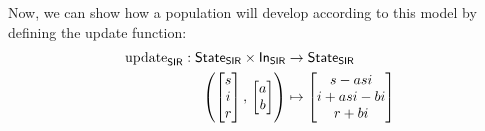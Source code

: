 \documentclass[DynamicalBook]{subfiles}
\begin{document}
\begin{example}
  Now, we can show how a population will develop according to this model by
  defining the update function:
  \begin{align}\label{eqn.SIR_model_discrete}
    \mathrm{update}_{\mathsf{SIR}} : \mathsf{State}_{\mathsf{SIR}} \times \mathsf{In}_{\mathsf{SIR}} &\to \mathsf{State}_{\mathsf{SIR}}\\
    \left( \begin{bmatrix} s\\ i\\ r\\ \end{bmatrix},\, \begin{bmatrix}a \\ b \end{bmatrix} \right) &\mapsto \begin{bmatrix}s - a s i \\ i + a s i - b  i \\ r + b i \end{bmatrix}
  \end{align}

\end{example}
\end{document}

